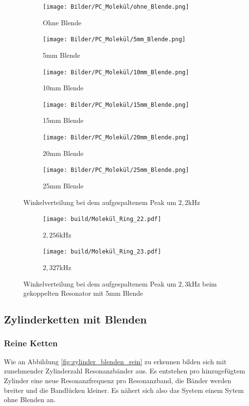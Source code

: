 \begin{figure}
  \centering
  \begin{subfigure}{0.4\textwidth}
    \centering
    \texttt{[image: Bilder/PC\_Molekül/ohne\_Blende.png]}
    \caption{Ohne Blende}
  \end{subfigure}
  \begin{subfigure}{0.4\textwidth}
    \centering
    \texttt{[image: Bilder/PC\_Molekül/5mm\_Blende.png]}
    \caption{5mm Blende}
  \end{subfigure}
  \begin{subfigure}{0.4\textwidth}
    \centering
    \texttt{[image: Bilder/PC\_Molekül/10mm\_Blende.png]}
    \caption{10mm Blende}
  \end{subfigure}
  \begin{subfigure}{0.4\textwidth}
    \centering
    \texttt{[image: Bilder/PC\_Molekül/15mm\_Blende.png]}
    \caption{15mm Blende}
  \end{subfigure}
  \begin{subfigure}{0.4\textwidth}
    \centering
    \texttt{[image: Bilder/PC\_Molekül/20mm\_Blende.png]}
    \caption{20mm Blende}
  \end{subfigure}
  \begin{subfigure}{0.4\textwidth}
    \centering
    \texttt{[image: Bilder/PC\_Molekül/25mm\_Blende.png]}
    \caption{25mm Blende}
  \end{subfigure}
  \caption{Winkelverteilung bei dem aufgespaltenem Peak um $2,2$kHz}
  \label{fig:molekül_plots}
\end{figure}

\begin{figure}
  \centering
  \begin{subfigure}{0.4\textwidth}
    \centering
    \texttt{[image: build/Molekül\_Ring\_22.pdf]}
    \caption{$2,256$kHz}
  \end{subfigure}
  \begin{subfigure}{0.4\textwidth}
    \centering
    \texttt{[image: build/Molekül\_Ring\_23.pdf]}
    \caption{$2,327$kHz}
  \end{subfigure}
  \caption{Winkelverteilung bei dem aufgespaltenem Peak um $2,3$kHz beim gekoppelten Resonator mit 5mm Blende}
  \label{fig:molekül_plots_}
\end{figure}

\subsection{Zylinderketten mit Blenden}
\subsubsection{Reine Ketten}
Wie an Abbildung \ref{fig:zylinder_blenden_rein} zu erkennen bilden sich mit zunehmender Zylinderzahl Resonanzbänder aus.
Es entstehen pro hinzugefügtem Zylinder eine neue Resonanzfrequenz pro Resonanzband, die Bänder werden breiter und die Bandlücken kleiner.
Es nähert sich also das System einem Sytem ohne Blenden an.

